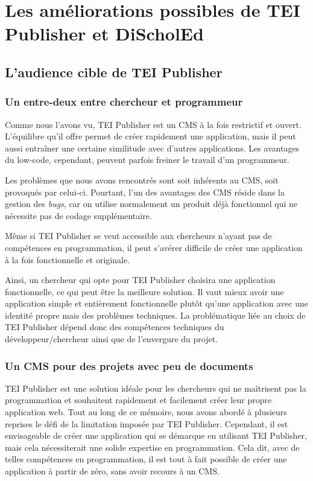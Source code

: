 \part{Les améliorations possibles de TEI Publisher et DiScholEd}

\setcounter{chapter}{0}

\chapter{L'audience cible de TEI Publisher}

\section{Un entre-deux entre chercheur et programmeur} 

Comme nous l'avons vu, TEI Publisher est un CMS à la fois restrictif et ouvert. L'équilibre qu'il offre permet de créer rapidement une application, mais il peut aussi entraîner une certaine similitude avec d'autres applications. Les avantages du low-code, cependant, peuvent parfois freiner le travail d'un programmeur.

Les problèmes que nous avons rencontrés sont soit inhérents au CMS, soit provoqués par celui-ci. Pourtant, l'un des avantages des CMS réside dans la gestion des \textit{bugs}, car on utilise normalement un produit déjà fonctionnel qui ne nécessite pas de codage supplémentaire.

Même si TEI Publisher se veut accessible aux chercheurs n'ayant pas de compétences en programmation, il peut s'avérer difficile de créer une application à la fois fonctionnelle et originale. 

Ainsi, un chercheur qui opte pour TEI Publisher choisira une application fonctionnelle, ce qui peut être la meilleure solution. Il vaut mieux avoir une application simple et entièrement fonctionnelle plutôt qu'une application avec une identité propre mais des problèmes techniques. La problématique liée au choix de TEI Publisher dépend donc des compétences techniques du développeur/chercheur ainsi que de l'envergure du projet.

\section{Un CMS pour des projets avec peu de documents}

TEI Publisher est une solution idéale pour les chercheurs qui ne maîtrisent pas la programmation et souhaitent rapidement et facilement créer leur propre application web. Tout au long de ce mémoire, nous avons abordé à plusieurs reprises le défi de la limitation imposée par TEI Publisher. Cependant, il est envisageable de créer une application qui se démarque en utilisant TEI Publisher, mais cela nécessiterait une solide expertise en programmation. Cela dit, avec de telles compétences en programmation, il est tout à fait possible de créer une application à partir de zéro, sans avoir recours à un CMS.

